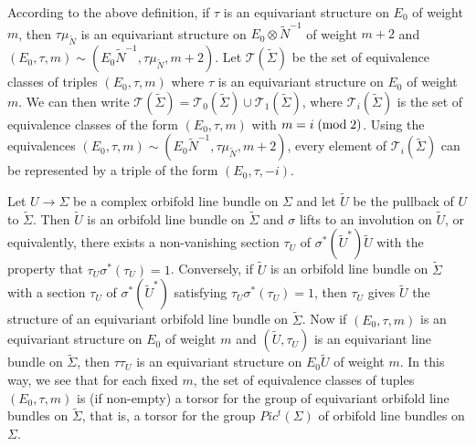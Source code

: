 \documentclass{amsart}
\theoremstyle{definition}
\theoremstyle{remark}
\numberwithin{equation}{section}
\begin{document}
According to the above definition, if $\tau$ is an equivariant structure on $E_0$ of weight $m$, then $\tau \mu_{\widetilde{N}}$ is an equivariant structure on $E_0 \otimes \widetilde{N}^{-1}$ of weight $m+2$ and $(E_0 , \tau , m ) \sim (E_0 \widetilde{N}^{-1} , \tau \mu_{\widetilde{N}} , m+2 )$. Let $\mathcal{T}(\widetilde{\Sigma})$ be the set of equivalence classes of triples $(E_0 , \tau , m)$ where $\tau$ is an equivariant structure on $E_0$ of weight $m$. We can then write $\mathcal{T}(\widetilde{\Sigma}) = \mathcal{T}_0(\widetilde{\Sigma}) \cup \mathcal{T}_1(\widetilde{\Sigma})$, where $\mathcal{T}_i(\widetilde{\Sigma})$ is the set of equivalence classes of the form $(E_0 , \tau , m)$ with $m = i \; ({\rm mod} \; 2)$. Using the equivalences $(E_0 , \tau , m ) \sim (E_0 \widetilde{N}^{-1} , \tau \mu_{\widetilde{N}} , m+2 )$, every element of $\mathcal{T}_i(\widetilde{\Sigma})$ can be represented by a triple of the form $(E_0 , \tau , -i)$.

Let $U \to \Sigma$ be a complex orbifold line bundle on $\Sigma$ and let $\widetilde{U}$ be the pullback of $U$ to $\widetilde{\Sigma}$. Then $\widetilde{U}$ is an orbifold line bundle on $\widetilde{\Sigma}$ and $\sigma$ lifts to an involution on $\widetilde{U}$, or equivalently, there exists a non-vanishing section $\tau_U$ of $\sigma^*(\widetilde{U}^*) \widetilde{U}$ with the property that $\tau_U \sigma^*(\tau_U) = 1$. Conversely, if $\widetilde{U}$ is an orbifold line bundle on $\widetilde{\Sigma}$ with a section $\tau_U$ of $\sigma^*(\widetilde{U}^*)$ satisfying $\tau_U \sigma^*(\tau_U) = 1$, then $\tau_U$ gives $\widetilde{U}$ the structure of an equivariant orbifold line bundle on $\widetilde{\Sigma}$. Now if $(E_0 , \tau , m)$ is an equivariant structure on $E_0$ of weight $m$ and $(\widetilde{U} , \tau_U)$ is an equivariant line bundle on $\widetilde{\Sigma}$, then $\tau \tau_U$ is an equivariant structure on $E_0 \widetilde{U}$ of weight $m$. In this way, we see that for each fixed $m$, the set of equivalence classes of tuples $(E_0 , \tau , m)$ is (if non-empty) a torsor for the group of equivariant orbifold line bundles on $\widetilde{\Sigma}$, that is, a torsor for the group $Pic^t(\Sigma)$ of orbifold line bundles on $\Sigma$.
\end{document}
